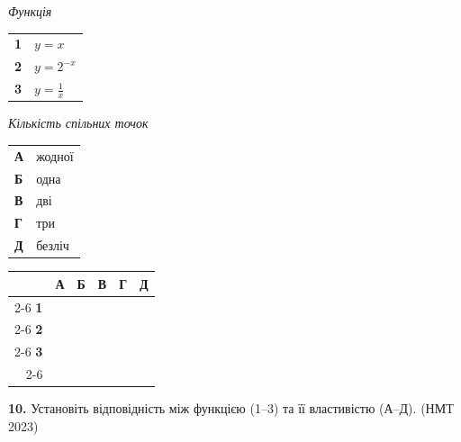 \documentclass[14pt]{extarticle}
\newcommand{\answerGrid}{
    \begingroup
    \setlength{\tabcolsep}{4pt}
    \renewcommand{\arraystretch}{1.2}
    \small
    \begin{tabular}{r|c|c|c|c|c|}
         \multicolumn{1}{c}{} & \multicolumn{1}{c}{\textbf{А}} & \multicolumn{1}{c}{\textbf{Б}} & \multicolumn{1}{c}{\textbf{В}} & \multicolumn{1}{c}{\textbf{Г}} & \multicolumn{1}{c}{\textbf{Д}} \\ \cline{2-6}
         \textbf{1} & & & & & \\ \cline{2-6}
         \textbf{2} & & & & & \\ \cline{2-6}
         \textbf{3} & & & & & \\ \cline{2-6}
    \end{tabular}
    \endgroup
}
\newcommand{\nmtyear}[1]{\hfill{\small\color{yearcolor}(НМТ #1)}}
\begin{document}
\noindent
\begin{minipage}[t]{0.45\textwidth}
    \textit{Функція} \par \vspace{0.2cm}
    \begin{tabular}{@{}p{0.5cm} l@{}}
    \textbf{1} & $y = x$ \\[0.4cm]
    \textbf{2} & \colorbox{yellow!30}{$y = 2^{-x}$} \\[0.4cm]
    \textbf{3} & $y = \displaystyle\frac{1}{x}$ \\
    \end{tabular}
\end{minipage}%
\hfill
\begin{minipage}[t]{0.50\textwidth}
    \textit{Кількість спільних точок} \par \vspace{0.2cm}
    \begin{tabular}{@{}p{0.5cm} p{7cm}@{}}
    \textbf{А} & жодної \\[0.2cm]
    \textbf{Б} & одна \\[0.2cm]
    \textbf{В} & дві \\[0.2cm]
    \textbf{Г} & три \\[0.2cm]
    \textbf{Д} & безліч \\
    \end{tabular}
\end{minipage}
\vspace{0.3cm}

\answerGrid
\vspace{0.7cm}

\noindent\textbf{10.} Установіть відповідність між функцією (1–3) та її властивістю (А–Д). \nmtyear{2023}
\vspace{0.3cm}
\end{document}
